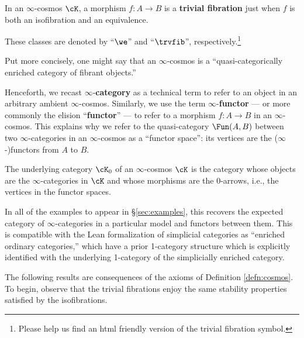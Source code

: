 \begin{definition}\label{defn:trivial-fibration}
  In an $\infty$-cosmos $\cK$, a morphism $f\colon A \to B$ is a \textbf{trivial fibration} just when $f$ is both an isofibration and an equivalence.
\end{definition}

These classes are denoted by ``$\we$''  and ``$\trvfib$'', respectively.\footnote{Please help us find an html friendly version of the trivial fibration symbol.}

Put more concisely, one might say that an $\infty$-cosmos is a ``quasi-cat\-e\-go\-ri\-cal\-ly enriched category of fibrant objects.'' %

\begin{con}
  Henceforth, we recast $\infty$-\textbf{category} as a technical term to refer to an object in an arbitrary ambient $\infty$-cosmos. Similarly, we use the term $\infty$-\textbf{functor} --- or more commonly the elision ``\textbf{functor}'' --- to refer to a morphism $f \colon A \to B$ in an $\infty$-cosmos. This explains why we refer to the quasi-category $\Fun(A,B)$ between two $\infty$-categories in an $\infty$-cosmos as a ``functor space'': its vertices are the ($\infty$-)functors from $A$ to $B$.
\end{con}

\begin{definition}\label{defn:underlying-cat-of-cosmos}
   The underlying category $\cK_0$ of an $\infty$-cosmos $\cK$ is the category whose objects are the $\infty$-categories in $\cK$ and whose morphisms are the $0$-arrows, i.e., the vertices in the functor spaces.
\end{definition}

In all of the examples to appear in \S\ref{sec:examples}, this recovers the expected category of $\infty$-categories in a particular model and functors between them. This is compatible with the Lean formalization of simplicial categories as ``enriched ordinary categories,'' which have a prior 1-category structure which is explicitly identified with the underlying 1-category of the simplicially enriched category.

The following results are consequences of the axioms of Definition \ref{defn:cosmos}. To begin, observe that the trivial fibrations enjoy the same stability properties satisfied by the isofibrations.


